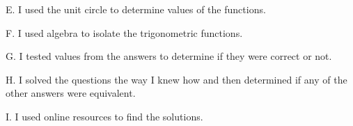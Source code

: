 \documentclass{ximera}
\begin{document}
\begin{question}
\begin{question}
    E. I used the unit circle to determine values of the functions.

    \begin{multipleChoice}
    \end{multipleChoice}
    
\end{question}

\begin{question}
    
    F. I used algebra to isolate the trigonometric functions.

    \begin{multipleChoice}
    \end{multipleChoice}
    
\end{question}

\begin{question}
    
    G. I tested values from the answers to determine if they were correct or not.

    \begin{multipleChoice}
    \end{multipleChoice}
    
\end{question}

\begin{question}
    
    H. I solved the questions the way I knew how and then determined if any of the other answers were equivalent.

    \begin{multipleChoice}
    \end{multipleChoice}
    
\end{question}

\begin{question}
    
    I. I used online resources to find the solutions.

    \begin{multipleChoice}
    \end{multipleChoice}
    
\end{question}
\begin{question}    
    

\end{question}
\end{question}
\end{document}
